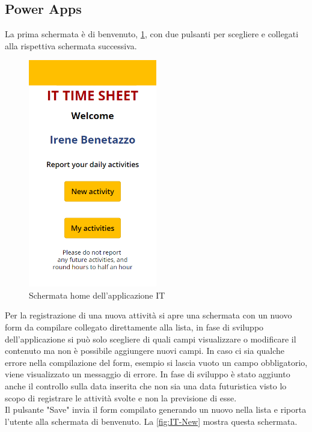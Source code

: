\newpage %
\subsection{Power Apps}
La prima schermata è di benvenuto, \figurename \space \ref*{fig:IT-Home}, con due pulsanti per scegliere e collegati alla rispettiva schermata successiva.
\begin{figure}[H]
  \centering\includegraphics[width=0.5\textwidth, height=0.5\textheight,keepaspectratio]{immagini/IT-home.png}
  \caption{Schermata home dell'applicazione IT}
  \label{fig:IT-Home}
\end{figure}
Per la registrazione di una nuova attività si apre una schermata con un nuovo form da compilare collegato direttamente alla lista, in fase di sviluppo dell'applicazione si può solo scegliere di quali campi visualizzare o modificare il contenuto ma non è possibile aggiungere nuovi campi.
In caso ci sia qualche errore nella compilazione del form, esempio si lascia vuoto un campo obbligatorio, viene visualizzato un messaggio di errore.
In fase di sviluppo è stato aggiunto anche il controllo sulla data inserita che non sia una data futuristica visto lo scopo di registrare le attività svolte e non la previsione di esse.\\
Il pulsante "Save" invia il form compilato generando un nuovo  nella lista e riporta l'utente alla schermata di benvenuto.
La \figurename \space \ref*{fig:IT-New} mostra questa schermata.\\
